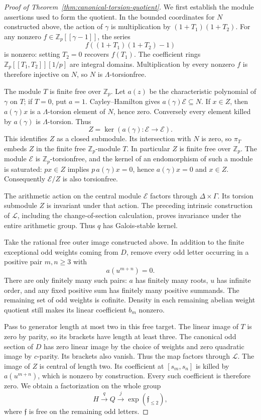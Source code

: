 \documentclass[11pt]{article}
\theoremstyle{definition}\newtheorem{definition}[theorem]{Definition}
\begin{document}
\begin{proof}[Proof of Theorem~\ref{thm:canonical-torsion-quotient}]
We first establish the module assertions used to form the quotient.
In the bounded coordinates for $N$ constructed above, the action
of $\gamma$ is multiplication by $(1+T_1)(1+T_2)$.
For any nonzero $f\in\mathbb Z_p[[\gamma-1]]$, the series
\[
             f((1+T_1)(1+T_2)-1)
\]
is nonzero: setting $T_2=0$ recovers $f(T_1)$.
The coefficient rings $\mathbb Z_p[[T_1,T_2]][1/p]$ are
integral domains. Multiplication by every nonzero $f$ is
therefore injective on $N$, so $N$ is $\Lambda$-torsionfree.

The module $T$ is finite free over $\mathbb Z_p$.
Let $a(z)$ be the characteristic polynomial of $\gamma$ on
$T$; if $T=0$, put $a=1$. Cayley--Hamilton gives
$a(\gamma)\mathcal E\subseteq N$. If $x\in Z$, then
$a(\gamma)x$ is a $\Lambda$-torsion element of $N$, hence zero.
Conversely every element killed by $a(\gamma)$ is
$\Lambda$-torsion. Thus
\[
                     Z=\ker(a(\gamma):\mathcal E\to\mathcal E).
\]
This identifies $Z$ as a closed submodule. Its intersection
with $N$ is zero, so $\pi_T$ embeds $Z$ in the finite free
$\mathbb Z_p$-module $T$. In particular $Z$ is finite free
over $\mathbb Z_p$. The module $\mathcal E$ is
$\mathbb Z_p$-torsionfree, and the kernel of an endomorphism
of such a module is saturated: $px\in Z$ implies
$p\,a(\gamma)x=0$, hence $a(\gamma)x=0$ and $x\in Z$.
Consequently $\mathcal E/Z$ is also torsionfree.

The arithmetic action on the central module $\mathcal E$
factors through $\Delta\times\Gamma$. Its torsion submodule
$Z$ is invariant under that action. The preceding intrinsic
construction of $\mathcal L$, including the change-of-section
calculation, proves invariance under the entire arithmetic
group. Thus $q$ has Galois-stable kernel.

Take the rational free outer image constructed above. In
addition to the finite exceptional odd weights coming from
$D$, remove every odd letter occurring in a positive pair
$m,n\geq3$ with
\[
                              a(u^{m+n})=0.
\]
There are only finitely many such pairs: $a$ has finitely
many roots, $u$ has infinite order, and any fixed positive
sum has finitely many positive summands. The remaining
set of odd weights is cofinite. Density in each remaining
abelian weight quotient still makes its linear coefficient
$b_m$ nonzero.

Pass to generator length at most two in this free target.
The linear image of $T$ is zero by parity, so its brackets
have length at least three. The canonical odd section of $D$
has zero linear image by the choice of weights and zero
quadratic image by $c$-parity. Its brackets also vanish.
Thus the map factors through $\mathcal L$.
The image of $Z$ is central of length two. Its coefficient
at $[s_m,s_n]$ is killed by $a(u^{m+n})$, which is nonzero
by construction. Every such coefficient is therefore zero.
We obtain a factorization on the whole group
\[
 H\xrightarrow{q} Q\xrightarrow{j}
      \exp(\mathfrak f_{\leq2}),
\]
where $\mathfrak f$ is free on the remaining odd letters.


\end{proof}
\end{document}
